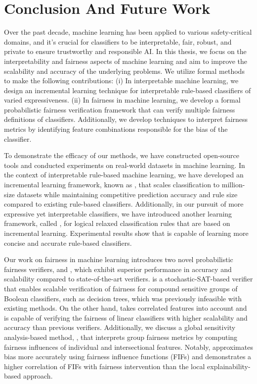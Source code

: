 \chapter{Conclusion And Future Work}
\label{chapter:conclusion} 
Over the past decade, machine learning has been applied to various safety-critical domains, and it's crucial for classifiers to be interpretable, fair, robust, and private to ensure trustworthy and responsible AI. In this thesis, we focus on the interpretability and fairness aspects of machine learning and aim to improve the scalability and accuracy of the underlying problems. We utilize formal methods to make the following contributions: (i) In interpretable machine learning, we design an incremental learning technique for interpretable rule-based classifiers of varied expressiveness. (ii) In fairness in machine learning, we develop a formal probabilistic fairness verification framework that can verify multiple fairness definitions of classifiers.  Additionally, we develop techniques to interpret fairness metrics by identifying feature combinations responsible for the bias of the classifier.



To demonstrate the efficacy of our methods, we have constructed open-source tools and conducted experiments on real-world datasets in machine learning. In the context of interpretable rule-based machine learning, we have developed an incremental learning framework, known as {\imli}, that scales classification to million-size datasets while maintaining competitive prediction accuracy and rule size compared to existing rule-based classifiers. Additionally, in our pursuit of more expressive yet interpretable classifiers, we have introduced another learning framework, called {\crr}, for logical relaxed classification rules that are based on incremental learning. Experimental results show that {\crr} is capable of learning more concise and accurate rule-based classifiers.


Our work on fairness in machine learning introduces two novel probabilistic fairness verifiers, {\justicia} and {\fvgm}, which exhibit superior performance in accuracy and scalability compared to state-of-the-art verifiers. {\justicia} is a stochastic-SAT-based verifier that enables scalable verification of fairness for compound sensitive groups of Boolean classifiers, such as decision trees, which was previously infeasible with existing methods. On the other hand, {\fvgm} takes correlated features into account and is capable of verifying the fairness of linear classifiers with higher scalability and accuracy than previous verifiers. Additionally, we discuss a global sensitivity analysis-based method, {\fairXplainer}, that interprets group fairness metrics by computing fairness influences of individual and intersectional features. Notably, {\fairXplainer} approximates bias more accurately using fairness influence functions (FIFs) and demonstrates a higher correlation of FIFs with fairness intervention than the local explainability-based approach.



